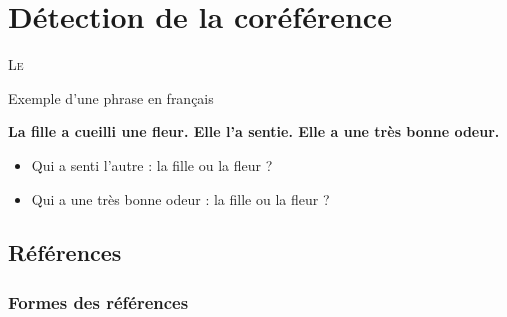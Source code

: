 \documentclass{KodeBook}
\begin{document}
		\mainmatter
	
\fi
\chapter{Détection de la coréférence}

\begin{introduction}
	\lettrine{L}{e} 
\end{introduction} 

\begin{exampleblock}{Exemple d'une phrase en français}
	\begin{center}
		\Large\bfseries
		La fille a cueilli une fleur. Elle l'a sentie. Elle a une très bonne odeur.
	\end{center}
\end{exampleblock}

\begin{itemize}
	\item Qui a senti l'autre : la fille ou la fleur ?
	\item Qui a une très bonne odeur : la fille ou la fleur ?
\end{itemize}

\section{Références}

\subsection{Formes des références}
\end{document}
